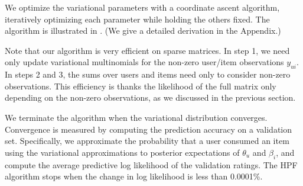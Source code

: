 
We optimize the variational parameters with a coordinate ascent
algorithm, iteratively optimizing each parameter while holding the
others fixed.  The algorithm is illustrated in .  (We
give a detailed derivation in the Appendix.)

Note that our algorithm is very efficient on sparse matrices. In step
1, we need only update variational multinomials for the non-zero
user/item observations $y_{ui}$.  In steps 2 and 3, the sums over
users and items need only to consider non-zero observations.  This
efficiency is thanks the likelihood of the full matrix only depending
on the non-zero observations, as we discussed in the previous section.





We terminate the algorithm when the variational distribution
converges. Convergence is measured by computing the prediction
accuracy on a validation set.  Specifically, we approximate the
probability that a user consumed an item using the variational
approximations to posterior expectations of $\theta_u$ and $\beta_i$,
and compute the average predictive log likelihood of the validation
ratings. The HPF algorithm stops when the change in log likelihood is
less than 0.0001\%.

